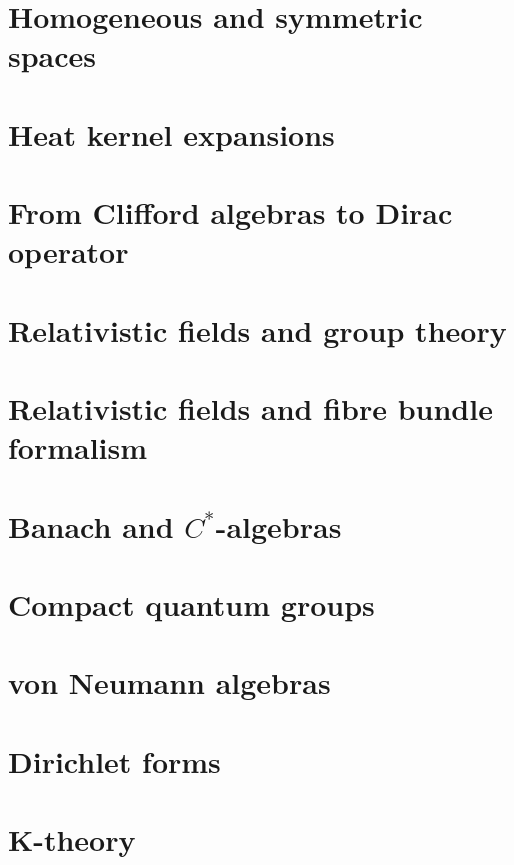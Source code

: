 \chapter{Homogeneous and symmetric spaces}




\chapter{Heat kernel expansions}


\chapter{From Clifford algebras to Dirac operator}



\chapter{Relativistic fields and group theory}


\chapter{Relativistic fields and fibre bundle formalism}


\chapter{Banach and \texorpdfstring{$C^*$}{C*}-algebras}
   
   
   

\chapter{Compact quantum groups}


\chapter{von Neumann algebras}





\chapter{Dirichlet forms}


\chapter{K-theory}


